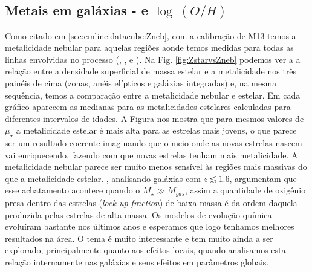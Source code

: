 \subsection{Metais em galáxias -  e $\log\ (O/H)$}
\label{sec:synvsneb:ZemuZR}

Como citado em \ref{sec:emline:datacube:Zneb}, com a calibração de M13 temos a metalicidade nebular
para aquelas regiões aonde temos medidas para todas as linhas envolvidas no processo (\Hbeta, \oIII,
\Halpha e \nII). Na Fig. \ref{fig:ZstarvsZneb} podemos ver a a relação entre a densidade superficial
de massa estelar e a metalicidade nos três painéis de cima (zonas, anéis elípticos e galáxias
integradas) e, na mesma sequência, temos a comparação entre a metalicidade nebular e estelar. Em
cada gráfico aparecem as medianas para as metalicidades estelares calculadas para diferentes
intervalos de idades. A Figura nos mostra que para mesmos valores de $\mu_\star$ a metalicidade
estelar é mais alta para as estrelas mais jovens, o que parece ser um resultado coerente imaginando
que o meio onde as novas estrelas nascem vai enriquecendo, fazendo com que novas estrelas tenham
mais metalicidade. A metalicidade nebular parece ser muito menos sensível às regiões mais massivas
do que a metalicidade estelar. \citet{Zahid.etal.2014a}, analisando galáxias com $z \lesssim 1.6$,
argumentam que esse achatamento acontece quando o $M_\star \gg M_{gas}$, assim a quantidade de
oxigênio presa dentro das estrelas ({\em lock-up fraction}) de baixa massa é da ordem daquela
produzida pelas estrelas de alta massa. Os modelos de evolução química evoluíram bastante nos
últimos anos \citep[e.g., ][]{Lilly.etal.2013a, Peng.Maiolino.2014a, Ascasibar.etal.2015a,
Peng.Maiolino.Cochrane.2015a} e esperamos que logo tenhamos melhores resultados na área. O tema é
muito interessante e tem muito ainda a ser explorado, principalmente quanto aos efeitos locais,
quando analisamos esta relação internamente nas galáxias e seus efeitos em parâmetros globais.

